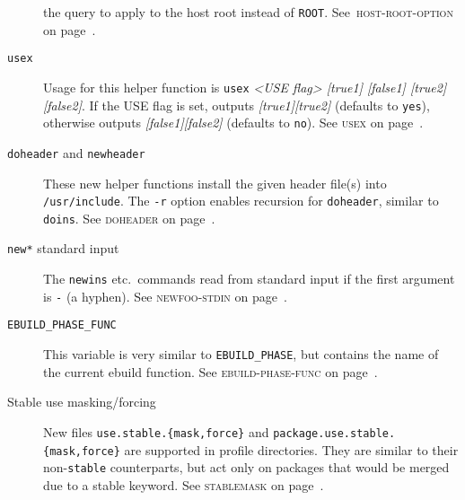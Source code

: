\documentclass[a4paper]{leaflet}
\newcommand{\code}[1]{\texttt{#1}}
\newcommand{\featureref}[1]{\textsc{#1} on page~\pageref{feat:#1}}
\begin{document}
\begin{description}
    the query to apply to the host root instead of \code{ROOT}.
    See~\featureref{host-root-option}.
    \item[\code{usex}] Usage for this helper function is
    \code{usex} \emph{<USE flag> [true1] [false1] [true2] [false2]}.
    If the USE flag is set, outputs \emph{[true1][true2]}
    (defaults to \code{yes}), otherwise outputs
    \emph{[false1][false2]} (defaults to \code{no}).
    See \featureref{usex}.
    \item[\code{doheader} and \code{newheader}] These new helper
    functions install the given header file(s) into
    \code{/usr/include}. The \code{-r} option enables recursion for
    \code{doheader}, similar to \code{doins}.
    See \featureref{doheader}.
    \item[\code{new*} standard input] The \code{newins} etc.\ commands
    read from standard input if the first argument is \code{-}
    (a hyphen).
    See \featureref{newfoo-stdin}.
    \item[\code{EBUILD\_PHASE\_FUNC}] This variable is very similar to
    \code{EBUILD\_PHASE}, but contains the name of the current ebuild
    function.
    See \featureref{ebuild-phase-func}.
    \item[Stable use masking/forcing] New files
    \code{use.stable.\allowbreak\{mask,force\}} and
    \code{package.use.stable.\allowbreak\{mask,force\}}
    are supported in profile directories.  They are similar to their
    non-\code{stable} counterparts, but act only on packages that
    would be merged due to a stable keyword.
    See \featureref{stablemask}.
\end{description}
\end{document}
